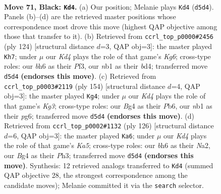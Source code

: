 \documentclass[11pt]{article}
\begin{document}
\clearpage

\begin{figure}[p]\centering
\begin{subfigure}{0.46\textwidth}\centering
\resizebox{\linewidth}{!}{%
\newchessgame
\chessboard[
  setfen={8/8/7B/p2k4/2p3b1/8/5K2/1N6 b - - 11 71},
  showmover=false,
  pgfstyle=straightmove, color=movearrow, markmove={d5-d4}
]}
\caption{}
\end{subfigure}\hfill
\begin{subfigure}{0.46\textwidth}\centering
\resizebox{\linewidth}{!}{%
\newchessgame
\chessboard[
  setfen={8/4k3/6KP/8/3b4/5P2/B7/8 w - - 3 63},
  showmover=false,
  pgfstyle=straightmove, color=movearrow, markmove={g6-h7}
]}
\caption{}
\end{subfigure}
\\[4pt]
\begin{subfigure}{0.46\textwidth}\centering
\resizebox{\linewidth}{!}{%
\newchessgame
\chessboard[
  setfen={b7/3k4/1P4p1/8/7P/6K1/8/2B5 w - - 15 78},
  showmover=false,
  pgfstyle=straightmove, color=movearrow, markmove={g3-g4}
]}
\caption{}
\end{subfigure}\hfill
\begin{subfigure}{0.46\textwidth}\centering
\resizebox{\linewidth}{!}{%
\newchessgame
\chessboard[
  setfen={8/8/8/KPb5/8/5k1P/N7/8 w - - 1 64},
  showmover=false,
  pgfstyle=straightmove, color=movearrow, markmove={a5-a6}
]}
\caption{}
\end{subfigure}
\caption{\textbf{Move 71, Black: \texttt{Kd4}.} (a) Our position; Melanie plays \texttt{Kd4} (\texttt{d5d4}). Panels (b)--(d) are the retrieved master positions whose correspondence most drove this move (highest QAP objective among those that transfer to it). (b) Retrieved from \texttt{ccrl\_top\_p0000\#2456} (ply 124) [structural distance $d$=3, QAP obj=3]: the master played \texttt{Kh7}; under $\mu$ our \emph{Kd4} plays the role of that game's \emph{Kg6}; cross-type roles: our \emph{b}h6 as their \emph{P}f3, our \emph{n}b1 as their \emph{b}d4; transferred move \texttt{d5d4} \textbf{(endorses this move)}. (c) Retrieved from \texttt{ccrl\_top\_p0003\#2119} (ply 154) [structural distance $d$=4, QAP obj=3]: the master played \texttt{Kg4}; under $\mu$ our \emph{Kd4} plays the role of that game's \emph{Kg3}; cross-type roles: our \emph{B}g4 as their \emph{P}b6, our \emph{n}b1 as their \emph{p}g6; transferred move \texttt{d5d4} \textbf{(endorses this move)}. (d) Retrieved from \texttt{ccrl\_top\_p0002\#1132} (ply 126) [structural distance $d$=6, QAP obj=3]: the master played \texttt{Ka6}; under $\mu$ our \emph{Kd4} plays the role of that game's \emph{Ka5}; cross-type roles: our \emph{b}h6 as their \emph{N}a2, our \emph{B}g4 as their \emph{P}h3; transferred move \texttt{d5d4} \textbf{(endorses this move)}. Synthesis: 12 retrieved analogs transferred to \texttt{Kd4} (summed QAP objective 28, the strongest correspondence among the candidate moves); Melanie committed it via the \texttt{search} selector.}
\label{fig:thought-m141}
\end{figure}
\end{document}
